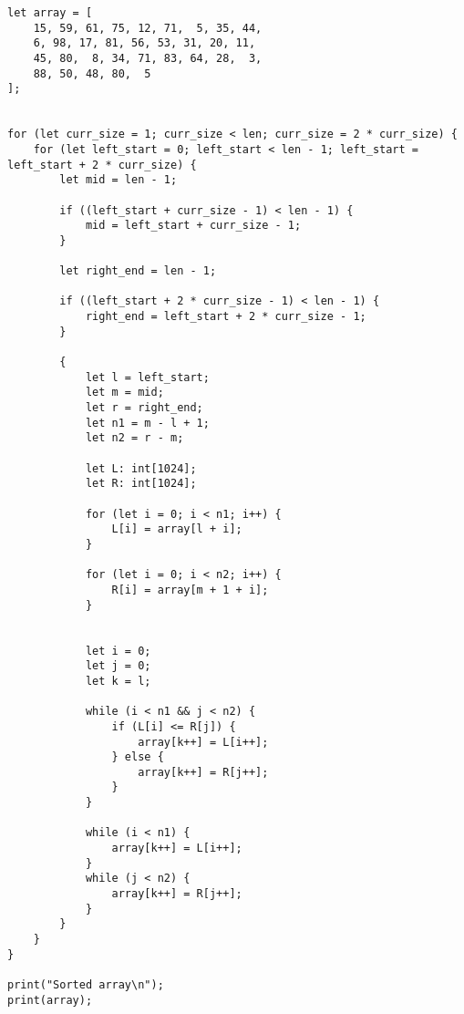 \documentclass[a4paper]{article}
\begin{document}
\begin{lstlisting}[laguage=DPL]
let array = [
    15, 59, 61, 75, 12, 71,  5, 35, 44,
    6, 98, 17, 81, 56, 53, 31, 20, 11,
    45, 80,  8, 34, 71, 83, 64, 28,  3,
    88, 50, 48, 80,  5
];


for (let curr_size = 1; curr_size < len; curr_size = 2 * curr_size) {
    for (let left_start = 0; left_start < len - 1; left_start = left_start + 2 * curr_size) {
        let mid = len - 1;

        if ((left_start + curr_size - 1) < len - 1) {
            mid = left_start + curr_size - 1;
        }

        let right_end = len - 1;

        if ((left_start + 2 * curr_size - 1) < len - 1) {
            right_end = left_start + 2 * curr_size - 1;
        }

        {
            let l = left_start;
            let m = mid;
            let r = right_end;
            let n1 = m - l + 1;
            let n2 = r - m;

            let L: int[1024];
            let R: int[1024];

            for (let i = 0; i < n1; i++) {
                L[i] = array[l + i];
            }

            for (let i = 0; i < n2; i++) {
                R[i] = array[m + 1 + i];
            }


            let i = 0;
            let j = 0;
            let k = l;

            while (i < n1 && j < n2) {
                if (L[i] <= R[j]) {
                    array[k++] = L[i++];
                } else {
                    array[k++] = R[j++];
                }
            }

            while (i < n1) {
                array[k++] = L[i++];
            }
            while (j < n2) {
                array[k++] = R[j++];
            }
        }
    }
}

print("Sorted array\n");
print(array);
\end{lstlisting}


%

%
\end{document}
